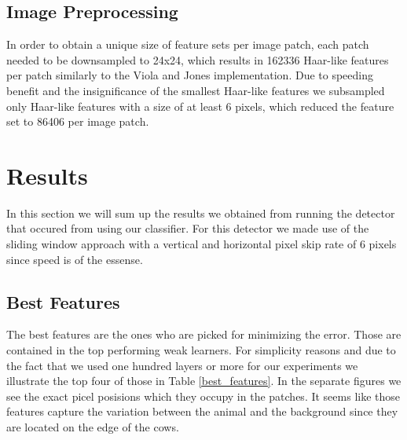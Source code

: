\documentclass[11pt]{article}
\begin{document}
\subsection{Image Preprocessing}
In order to obtain a unique size of feature sets per image patch, each patch needed to be downsampled to 24x24, which results in 162336 Haar-like features per patch similarly to the Viola and Jones implementation. Due to speeding benefit and the insignificance of the smallest Haar-like features we subsampled only Haar-like features with a size of at least 6 pixels, which reduced the feature set to 86406 per image patch.

\section{Results}
In this section we will sum up the results we obtained from running the detector that occured from using our classifier. For this detector we made use of the sliding window approach with a vertical and horizontal pixel skip rate of 6 pixels since speed is of the essense.

\subsection{Best Features}
The best features are the ones who are picked for minimizing the error. Those are contained in the top performing weak learners. For simplicity reasons and due to the fact that we used one hundred layers or more for our experiments we illustrate the top four of those in Table \ref{best_features}. In the separate figures we see the exact picel posisions which they occupy in the patches. It seems like those features capture the variation between the animal and the background since they are located on the edge of the cows.
\end{document}
